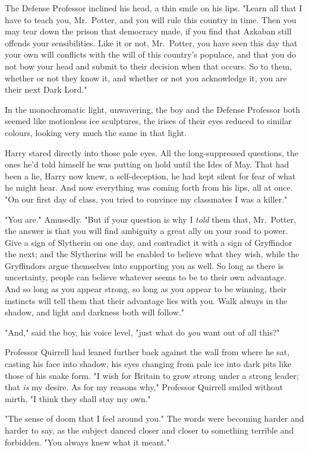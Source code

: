 The Defense Professor inclined his head, a thin smile on his lips. "Learn all
that I have to teach you, Mr.~Potter, and you will rule this country in time.
Then you may tear down the prison that democracy made, if you find that Azkaban
still offends your sensibilities. Like it or not, Mr.~Potter, you have seen
this day that your own will conflicts with the will of this country's populace,
and that you do not bow your head and submit to their decision when that
occurs. So to them, whether or not they know it, and whether or not you
acknowledge it, you are their next Dark Lord."

In the monochromatic light, unwavering, the boy and the Defense Professor both
seemed like motionless ice sculptures, the irises of their eyes reduced to
similar colours, looking very much the same in that light.

Harry stared directly into those pale eyes. All the long-suppressed questions,
the ones he'd told himself he was putting on hold until the Ides of May. That
had been a lie, Harry now knew, a self-deception, he had kept silent for fear
of what he might hear. And now everything was coming forth from his lips, all
at once. "On our first day of class, you tried to convince my classmates I was
a killer."

"You are." Amusedly. "But if your question is why I \emph{told} them that,
Mr.~Potter, the answer is that you will find ambiguity a great ally on your
road to power. Give a sign of Slytherin on one day, and contradict it with a
sign of Gryffindor the next; and the Slytherins will be enabled to believe what
they wish, while the Gryffindors argue themselves into supporting you as well.
So long as there is uncertainty, people can believe whatever seems to be to
their own advantage. And so long as you appear strong, so long as you appear to
be winning, their instincts will tell them that their advantage lies with you.
Walk always in the shadow, and light and darkness both will follow."

"And," said the boy, his voice level, "just what do \emph{you} want out of all
this?"

Professor Quirrell had leaned further back against the wall from where he sat,
casting his face into shadow, his eyes changing from pale ice into dark pits
like those of his snake form. "I wish for Britain to grow strong under a strong
leader; that \emph{is} my desire. As for my reasons why," Professor Quirrell
smiled without mirth, "I think they shall stay my own."

"The sense of doom that I feel around you." The words were becoming harder and
harder to say, as the subject danced closer and closer to something terrible
and forbidden. "You always knew what it meant."

